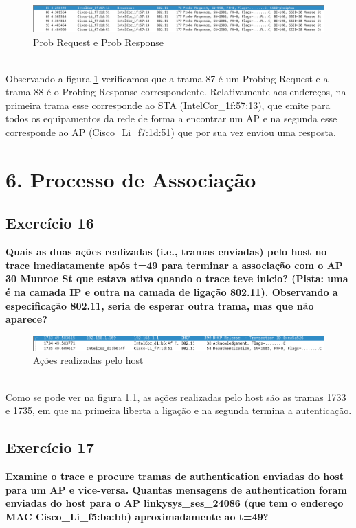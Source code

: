 \documentclass[a4paper]{report}
\begin{document}
\begin{figure}[H]
    \centering 
    \includegraphics[width=\textwidth]{images/probEx15.png}  
    \caption{Prob Request e Prob Response}
    \label{fig:probEx15}
\end{figure}\\

Observando a figura \ref{fig:probEx15} verificamos que a trama 87 é um Probing Request e a 
trama 88 é o Probing Response correspondente. Relativamente aos endereços, na primeira 
trama esse corresponde ao STA (IntelCor_1f:57:13), que emite para todos os equipamentos da
rede de forma a encontrar um AP e na segunda esse corresponde ao AP (Cisco_Li_f7:1d:51) que
por sua vez enviou uma resposta.

\chapter{6. Processo de Associação}
\section{Exercício 16}
\textbf{Quais as duas ações realizadas (i.e., tramas enviadas) pelo host no
    trace imediatamente após t=49 para terminar a associação com o AP 30 Munroe
    St que estava ativa quando o trace teve inicio? (Pista: uma é na camada IP e
    outra na camada de ligação 802.11). Observando a especificação 802.11, seria
    de esperar outra trama, mas que não aparece?}\\

\begin{figure}[H]
    \centering 
    \includegraphics[width=\textwidth]{images/acoesEx16.png}  
    \caption{Ações realizadas pelo host}
    \label{fig:acoesEx16}
\end{figure}\\

Como se pode ver na figura \ref{fig:acoesEx16}, as ações realizadas pelo host
são as tramas 1733 e 1735, em que na primeira liberta a ligação e na segunda 
termina a autenticação.

\section{Exercício 17}
\textbf{Examine o trace e procure tramas de authentication enviadas do host para
    um AP e vice-versa. Quantas mensagens de authentication foram enviadas do
    host para o AP linkysys\_ses\_24086 (que tem o endereço MAC
    Cisco\_Li\_f5:ba:bb) aproximadamente ao t=49?}\\
\end{document}
